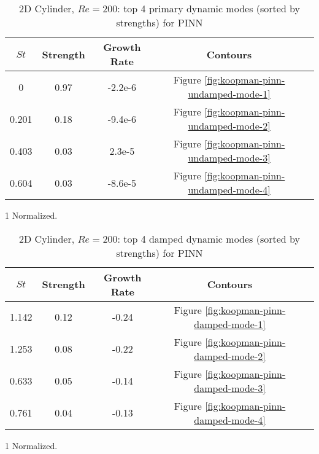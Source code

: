 \begin{table}[hbt!]
    \singlespacing
    \begin{threeparttable}[b]
        \begin{tabular}{ccccc}
            \toprule
            $St$ & Strength\tnote{1} & Growth Rate & Contours \\
            \midrule
            0     & 0.97 & -2.2e-6  & Figure \ref{fig:koopman-pinn-undamped-mode-1}\\
            0.201 & 0.18 & -9.4e-6 & Figure \ref{fig:koopman-pinn-undamped-mode-2}\\
            0.403 & 0.03 & 2.3e-5  & Figure \ref{fig:koopman-pinn-undamped-mode-3}\\
            0.604 & 0.03 & -8.6e-5  & Figure \ref{fig:koopman-pinn-undamped-mode-4}\\
            \bottomrule
        \end{tabular}%
        \begin{tablenotes}
            \footnotesize
            \item [1] Normalized.
        \end{tablenotes}
        \caption{%
            2D Cylinder, $Re=200$: top 4 primary dynamic modes (sorted by strengths) for PINN%
        }%
        \label{table:koopman-pinn-non-damped}
    \end{threeparttable}
\end{table}%

\begin{table}[hbt!]
    \singlespacing
    \begin{threeparttable}[b]
        \begin{tabular}{ccccc}
            \toprule
            $St$ & Strength\tnote{1} & Growth Rate & Contours \\
            \midrule
            1.142 & 0.12 & -0.24 & Figure \ref{fig:koopman-pinn-damped-mode-1}\\
            1.253 & 0.08 & -0.22 & Figure \ref{fig:koopman-pinn-damped-mode-2}\\
            0.633 & 0.05 & -0.14 & Figure \ref{fig:koopman-pinn-damped-mode-3}\\
            0.761 & 0.04 & -0.13 & Figure \ref{fig:koopman-pinn-damped-mode-4}\\
            \bottomrule
        \end{tabular}%
        \begin{tablenotes}
            \footnotesize
            \item [1] Normalized.
        \end{tablenotes}
        \caption{%
            2D Cylinder, $Re=200$: top 4 damped dynamic modes (sorted by strengths) for PINN%
        }%
        \label{table:koopman-pinn-damped}
    \end{threeparttable}
\end{table}%